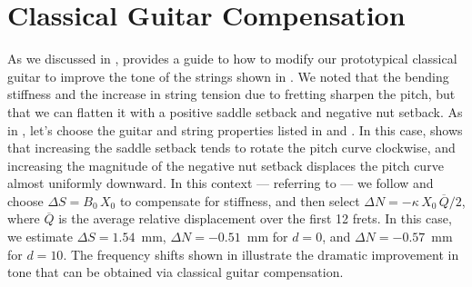 %
%
%

 \section{Classical Guitar Compensation\label{sct:comp}}

As we discussed in ,  provides a guide to how to modify our prototypical classical guitar to improve the tone of the strings shown in . We noted that the bending stiffness and the increase in string tension due to fretting sharpen the pitch, but that we can flatten it with a positive saddle setback and negative nut setback. As in , let's choose the guitar and string properties listed in  and . In this case,  shows that increasing the saddle setback tends to rotate the pitch curve clockwise, and increasing the magnitude of the negative nut setback displaces the pitch curve almost uniformly downward. In this context --- referring to  --- we follow  and choose $\Delta S = B_0\, X_0$ to compensate for stiffness, and then select $\Delta N = - \kappa\, X_0\, \overline{Q} / 2$, where $\overline{Q}$ is the average relative displacement over the first 12 frets. In this case, we estimate $\Delta S = 1.54$~mm, $\Delta N = -0.51$~mm for $d = 0$, and $\Delta N = -0.57$~mm for $d = 10$. The frequency shifts shown in  illustrate the dramatic improvement in tone that can be obtained via classical guitar compensation.

